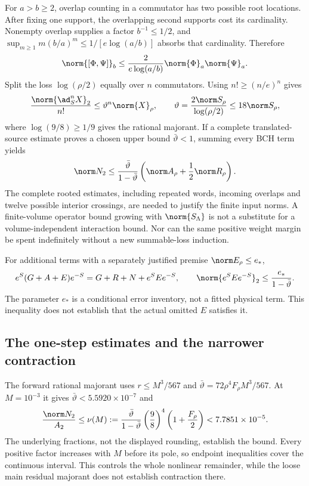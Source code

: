 For $a>b\ge2$, overlap counting in a commutator has two possible root locations. After fixing one support, the overlapping second supports cost its cardinality. Nonempty overlap supplies a factor $b^{-1}\le1/2$, and
$\sup_{m\ge1}m(b/a)^m\le1/[e\log(a/b)]$ absorbs that cardinality. Therefore
\begin{equation}
\norm{[\Phi,\Psi]}_b\le
\frac{2}{e\log(a/b)}\norm{\Phi}_a\norm{\Psi}_a.
\label{r27:eq:loss}
\end{equation}
Split the loss $\log(\rho/2)$ equally over $n$ commutators. Using
$n!\ge(n/e)^n$ gives
\begin{equation}
\frac{\norm{\ad_S^n X}_2}{n!}
\le\vartheta^n\norm{X}_\rho,\qquad
\vartheta=\frac{2\norm S_\rho}{\log(\rho/2)}
\le18\norm S_\rho,
\label{r27:eq:nested}
\end{equation}
where $\log(9/8)\ge1/9$ gives the rational majorant. If a complete translated-source estimate proves a chosen upper bound $\bar\vartheta<1$, summing every BCH term yields
\begin{equation}
\norm N_2\le\frac{\bar\vartheta}{1-\bar\vartheta}
\left(\norm A_\rho+\frac12\norm R_\rho\right).
\label{r27:eq:nonlinear}
\end{equation}
The complete rooted estimates, including repeated words, incoming overlaps and twelve possible interior crossings, are needed to justify the finite input norms. A finite-volume operator bound growing with $\norm{S_\Lambda}$ is not a substitute for a volume-independent interaction bound. Nor can the same positive weight margin be spent indefinitely without a new summable-loss induction.

For additional terms with a separately justified premise $\norm E_\rho\le e_*$,
\begin{equation}
e^S(G+A+E)e^{-S}=G+R+N+e^SEe^{-S},\qquad
\norm{e^SEe^{-S}}_2\le\frac{e_*}{1-\bar\vartheta}.
\label{r27:eq:extra}
\end{equation}
The parameter $e_*$ is a conditional error inventory, not a fitted physical term. This inequality does not establish that the actual omitted $E$ satisfies it.

\subsection{The one-step estimates and the narrower contraction}
The forward rational majorant uses $r\le M^3/567$ and
$\bar\vartheta=72\rho^4F_\rho M^3/567$. At $M=10^{-3}$ it gives
$\bar\vartheta<5.5920\times10^{-7}$ and
\begin{equation}
\frac{\norm N_2}{A_2}\le\nu(M):=
\frac{\bar\vartheta}{1-\bar\vartheta}\left(\frac98\right)^4
\left(1+\frac{F_\rho}{2}\right)<7.7851\times10^{-5}.
\label{r27:eq:nubudget}
\end{equation}
The underlying fractions, not the displayed rounding, establish the bound. Every positive factor increases with $M$ before its pole, so endpoint inequalities cover the continuous interval. This controls the whole nonlinear remainder, while the loose main residual majorant does not establish contraction there.


